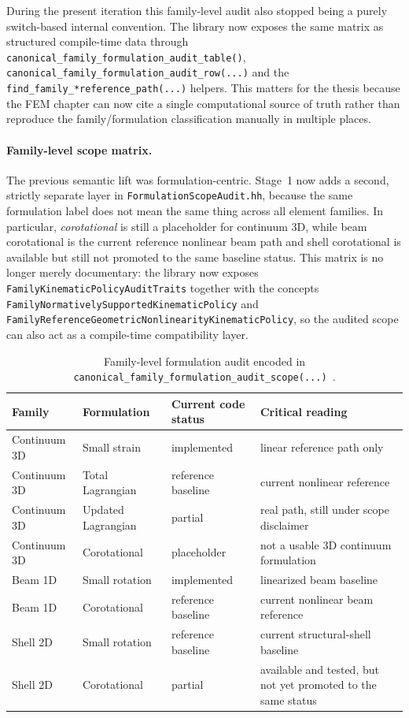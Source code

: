 During the present iteration this family-level audit also stopped being a
purely switch-based internal convention. The library now exposes the same
matrix as structured compile-time data through
\texttt{canonical\_family\_formulation\_audit\_table()},
\texttt{canonical\_family\_formulation\_audit\_row(...)} and the
\texttt{find\_family\_*reference\_path(...)} helpers. This matters for the
thesis because the FEM chapter can now cite a single computational source of
truth rather than reproduce the family/formulation classification manually in
multiple places.

\paragraph{Family-level scope matrix.}
The previous semantic lift was formulation-centric.  Stage~1 now adds a second,
strictly separate layer in \texttt{FormulationScopeAudit.hh}, because the same
formulation label does not mean the same thing across all element families.  In
particular, \emph{corotational} is still a placeholder for continuum 3D, while
beam corotational is the current reference nonlinear beam path and shell
corotational is available but still not promoted to the same baseline status.
This matrix is no longer merely documentary: the library now exposes
\texttt{FamilyKinematicPolicyAuditTraits} together with the concepts
\texttt{FamilyNormativelySupportedKinematicPolicy} and
\texttt{FamilyReferenceGeometricNonlinearityKinematicPolicy}, so the audited
scope can also act as a compile-time compatibility layer.

\begin{table}[htbp]
  \centering
  \caption{Family-level formulation audit encoded in
  \texttt{canonical\_family\_formulation\_audit\_scope(...) }.}
  \label{tab:stage1-family-formulation-audit}
  \small
  \begin{tabular}{@{}llll@{}}
    \toprule
    \textbf{Family} & \textbf{Formulation} & \textbf{Current code status}
    & \textbf{Critical reading} \\
    \midrule
    Continuum 3D & Small strain & implemented & linear reference path only \\
    Continuum 3D & Total Lagrangian & reference baseline & current nonlinear reference \\
    Continuum 3D & Updated Lagrangian & partial & real path, still under scope disclaimer \\
    Continuum 3D & Corotational & placeholder & not a usable 3D continuum formulation \\
    Beam 1D & Small rotation & implemented & linearized beam baseline \\
    Beam 1D & Corotational & reference baseline & current nonlinear beam reference \\
    Shell 2D & Small rotation & reference baseline & current structural-shell baseline \\
    Shell 2D & Corotational & partial & available and tested, but not yet promoted to the same status \\
    \bottomrule
  \end{tabular}
\end{table}

